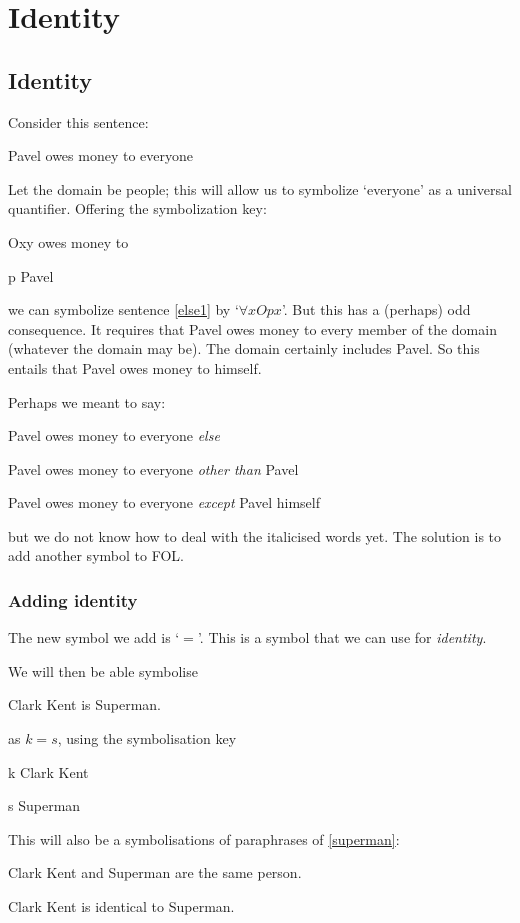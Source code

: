 \part{Identity}
\label{ch.identity}

\chapter{Identity}

Consider this sentence:
\begin{earg}
\item[\ex{else1}] Pavel owes money to everyone
\end{earg}
Let the domain be people; this will allow us to symbolize `everyone' as a universal quantifier. Offering the symbolization key:
	\begin{ekey}
		\item[Oxy]  owes money to 
		\item[p] Pavel
	\end{ekey}
we can symbolize sentence \ref{else1} by `$\forall x Opx$'. But this has a (perhaps) odd consequence. It requires that Pavel owes money to every member of the domain (whatever the domain may be). The domain certainly includes Pavel. So this entails that Pavel owes money to himself. 

Perhaps we meant to say:
	\begin{earg}
		\item[\ex{else1b}] Pavel owes money to everyone \emph{else}
		\item[\ex{else1c}] Pavel owes money to everyone \emph{other than} Pavel
		\item[\ex{else1d}] Pavel owes money to everyone \emph{except} Pavel himself
	\end{earg}
but we do not know how to deal with the italicised words yet. The solution is to add another symbol to FOL. 

\section{Adding identity}

The new symbol we add is `$=$'. This is a symbol that we can use for \emph{identity}. 

We will then be able symbolise 
\begin{earg}
\item[\ex{superman}] Clark Kent is Superman.
\end{earg}
as $k=s$, using the symbolisation key
\begin{ekey}
\item[k] Clark Kent
\item[s] Superman
\end{ekey} 
This will also be a symbolisations of paraphrases of \ref{superman}:
\begin{earg}
\item[\ex{superman1b}] Clark Kent and Superman are the same person.
\item[\ex{superman1c}] Clark Kent is identical to Superman. 
\end{earg}

